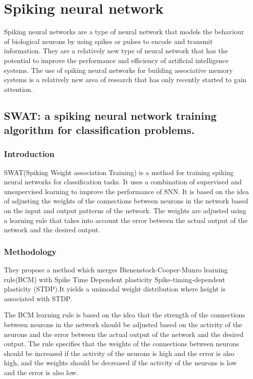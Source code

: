 \section{Spiking neural network}
Spiking neural networks are a type of neural network that models the behaviour
of biological neurons by using spikes or pulses to encode and transmit
information. They are a relatively new type of neural network that has the
potential to improve the performance and efficiency of artificial intelligence
systems. The use of spiking neural networks for building associative memory
systems is a relatively new area of research that has only recently started to
gain attention.

\subsection{SWAT: a spiking neural network training algorithm for classification problems.}
\subsubsection{Introduction}
SWAT\cite{swat}(Spiking Weight association Training) is a method for training
spiking neural networks for classification tasks. It uses a combination of
supervised and unsupervised learning to improve the performance of SNN. It is
based on the idea of adjusting the weights of the connections between neurons
in the network based on the input and output patterns of the network. The
weights are adjusted using a learning rule that takes into account the error
between the actual output of the network and the desired output.
\subsubsection{Methodology}
They propose a method which merges Bienenstock-Cooper-Munro learning
rule(BCM)\cite{bcm} with Spike Time Dependent plasticity Spike-timing-dependent
plasticity (STDP)\cite{stdp}.It yields a unimodal weight distribution where
height is associated with STDP.

The BCM learning rule is based on the idea that the strength of the connections
between neurons in the network should be adjusted based on the activity of the
neurons and the error between the actual output of the network and the desired
output. The rule specifies that the weights of the connections between neurons
should be increased if the activity of the neurons is high and the error is
also high, and the weights should be decreased if the activity of the neurons
is low and the error is also low.

